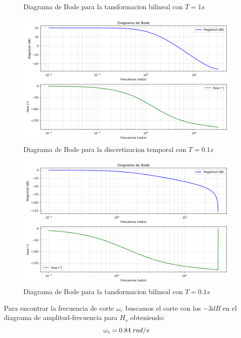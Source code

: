 \documentclass[a4paper,12pt]{report}
\begin{document}
\begin{enumerate}[label=\alph*), left=0pt]
\begin{figure}[H]
                \caption{Diagrama de Bode para la tansformacion bilineal con $T=1s$}
              \end{figure}
              \begin{figure}[H]
                \centering
                \includegraphics[width=1\linewidth]{./images/BodeD2.png}
                \caption{Diagrama de Bode para la discretizacion temporal con $T=0.1s$}
              \end{figure}
              \begin{figure}[H]
                \centering
                \includegraphics[width=1\linewidth]{./images/BodeB2.png}
                \caption{Diagrama de Bode para la tansformacion bilineal con $T=0.1s$}
              \end{figure}

              Para encontrar la frecuencia de corte $\omega_c$ buscamos el corte con los $-3dB$
              en el diagrama de amplitud-frecuencia para $H_s$ obteniendo:
              $$\omega_c=0.84 \hspace{1mm} rad/s$$


\end{enumerate}
\end{document}
